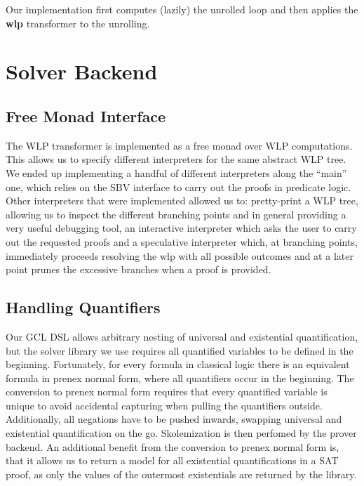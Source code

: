 \documentclass[]{scrartcl}
\begin{document}
Our implementation first computes (lazily) the unrolled loop and then applies
the \textbf{wlp} transformer to the unrolling.


\section{Solver Backend}


\subsection{Free Monad Interface}

The WLP transformer is implemented as a free monad over WLP computations.
This allows us to specify different interpreters for the same abstract WLP tree.
We ended up implementing a handful of different interpreters along the ``main''
one, which relies on the SBV interface to carry out the proofs in predicate logic.
Other interpreters that were implemented allowed us to: pretty-print a WLP tree,
allowing us to inspect the different branching points and in general providing
a very useful debugging tool, an interactive interpreter which asks the user
to carry out the requested proofs and a speculative interpreter which, at branching
points, immediately proceeds resolving the wlp with all possible outcomes and
at a later point prunes the excessive branches when a proof is provided.

\subsection{Handling Quantifiers}

Our GCL DSL allows arbitrary nesting of universal and existential quantification,
but the solver library we use requires all quantified variables to be defined in
the beginning.
Fortunately, for every formula in classical logic there is an equivalent formula
in prenex normal form, where all quantifiers occur in the beginning.
The conversion to prenex normal form requires that every quantified variable is
unique to avoid accidental capturing when pulling the quantifiers outside.
Additionally, all negations have to be pushed inwards, swapping universal and
existential quantification on the go.
Skolemization is then perfomed by the prover backend.
An additional benefit from the conversion to prenex normal form is, that it allows
us to return a model for all existential quantifications in a SAT proof, as only
the values of the outermost existentials are returned by the library.
\end{document}

